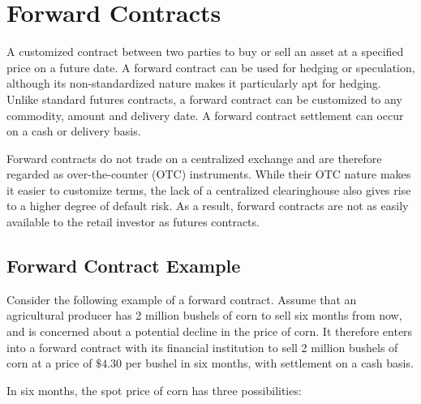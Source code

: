 \documentclass[11pt]{article} %
\begin{document}
\section{Forward Contracts}

A customized contract between two parties to buy or sell an asset at a specified price on a future date. A forward contract can be used for hedging or speculation, although its non-standardized nature makes it particularly apt for hedging. Unlike standard futures contracts, a forward contract can be customized to any commodity, amount and delivery date. A forward contract settlement can occur on a cash or delivery basis.


Forward contracts do not trade on a centralized exchange and are therefore regarded as over-the-counter (OTC) instruments. While their OTC nature makes it easier to customize terms, the lack of a centralized clearinghouse also gives rise to a higher degree of default risk. As a result, forward contracts are not as easily available to the retail investor as futures contracts.

\subsection*{Forward Contract Example}
Consider the following example of a forward contract. Assume that an agricultural producer has 2 million bushels of corn to sell six months from now, and is concerned about a potential decline in the price of corn. It therefore enters into a forward contract with its financial institution to sell 2 million bushels of corn at a price of $\$4.30$ per bushel in six months, with settlement on a cash basis.
\newline

\noindent In six months, the spot price of corn has three possibilities:
\end{document}
